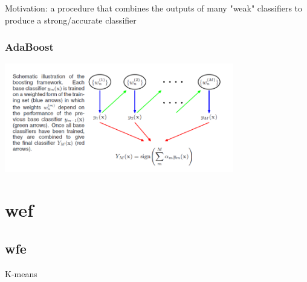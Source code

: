 \documentclass[11pt]{article}
\begin{document}
Motivation: a procedure that combines the outputs of many "weak" classifiers
to produce a strong/accurate classifier


\subsubsection{AdaBoost}
\label{sec:orgd9fad99}
\includegraphics[width=100mm]{Boosting}
\section{wef}
\label{sec:org9d6192f}
\subsection{wfe}
\label{sec:org3180259}
K-means
\end{document}
